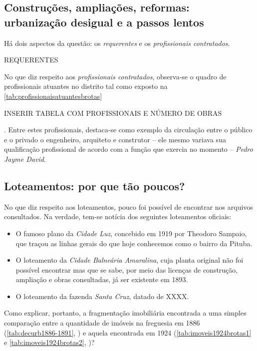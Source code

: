 \subsection{Construções, ampliações, reformas: urbanização desigual e a passos lentos}\label{subsec:constrampliref}

Há dois aspectos da questão: os \textit{requerentes} e os \textit{profissionais contratados}.

REQUERENTES

No que diz respeito aos \textit{profissionais contratados}, observa-se o quadro de profissionais atuantes no distrito tal como exposto na \autoref{tab:profissionaisatuantesbrotas}

INSERIR TABELA COM PROFISSIONAIS E NÚMERO DE OBRAS





 . Entre estes profissionais, destaca-se como exemplo da circulação entre o público e o privado o engenheiro, arquiteto e construtor -- ele mesmo variava sua qualificação profissional de acordo com a função que exercia no momento -- \textit{Pedro Jayme David}. 

\subsection{Loteamentos: por que tão poucos?}\label{subsec:loteamentos}

No que diz respeito aos loteamentos, pouco foi possível de encontrar nos arquivos consultados. Na verdade, tem-se notícia dos seguintes loteamentos oficiais:

\begin{itemize}
\item O famoso plano da \textit{Cidade Luz}, concebido em 1919 por Theodoro Sampaio, que traçou as linhas gerais do que hoje conhecemos como o bairro da Pituba.
\item O loteamento da \textit{Cidade Balneária Amaralina}, cuja planta original não foi possível encontrar mas que se sabe, por meio das licenças de construção, ampliação e obras consultadas, já ser existente em 1893.
\item O loteamento da fazenda \textit{Santa Cruz}, datado de XXXX.
\end{itemize} 

Como explicar, portanto, a fragmentação imobiliária encontrada a uma simples comparação entre a quantidade de imóveis na freguesia em 1886 (\autoref{tab:decurb1886-1891}, \pageref{tab:decurb1886-1891}) e aquela encontrada em 1924 (\autoref{tab:imoveis1924brotas1} e \autoref{tab:imoveis1924brotas2}, \pageref{tab:imoveis1924brotas2})?

